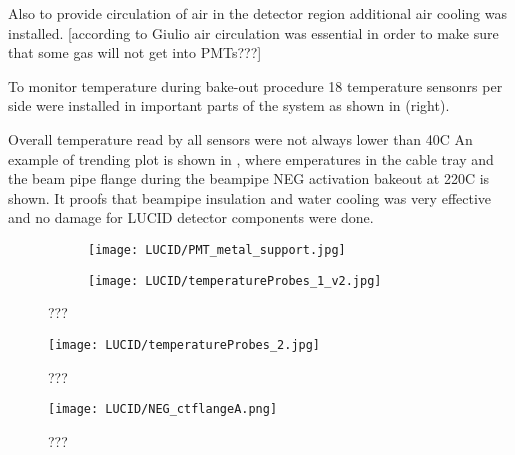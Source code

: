 Also to provide circulation of air in the detector region additional air cooling was installed. 
[according to Giulio air circulation was essential in order to make sure that some gas will not get into PMTs???]

To monitor temperature during bake-out procedure 18 temperature sensonrs per side were installed 
in important parts of the system as shown in  (right).

Overall temperature read by all sensors were not always lower than 40\degree C
An example of trending plot is shown in , where emperatures in the cable tray 
and the beam pipe flange during the beampipe NEG activation bakeout at 220\degree C is shown.
It proofs that beampipe insulation and water cooling was very effective and no damage for LUCID detector components 
were done.


\begin{figure}
\centering
\begin{subfigure}{.6\textwidth}
  \centering
  \texttt{[image: LUCID/PMT\_metal\_support.jpg]}
\end{subfigure}%
\begin{subfigure}{.4\textwidth}
  \centering
  \texttt{[image: LUCID/temperatureProbes\_1\_v2.jpg]}
\end{subfigure}
\caption{???}
\label{fig:metalSupportAndTempProbes}
\end{figure}



\begin{figure}
\centering
\texttt{[image: LUCID/temperatureProbes\_2.jpg]}
\caption{???}
\label{fig:temperatureProbes_VJCone}
\end{figure}




\begin{figure}
\centering
\texttt{[image: LUCID/NEG\_ctflangeA.png]}
\caption{???}
\label{fig:NEG_ctflangeA}
\end{figure}
 
 

